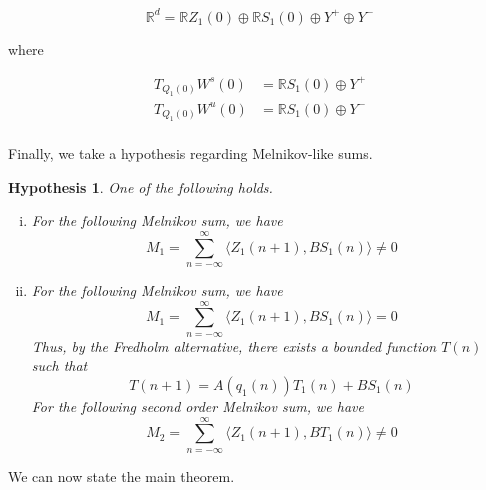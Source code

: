 \documentclass[12pt]{article}
\def\R{{\mathbb R}}
\newtheorem{hypothesis}{Hypothesis}
\begin{document}
\begin{equation}\label{tangentdecomp}
\R^d = \R Z_1(0) \oplus \R S_1(0) \oplus Y^+ \oplus Y^-
\end{equation}

where 

\begin{align*}
T_{Q_1(0)}W^s(0) &= \R S_1(0) \oplus Y^+ \\
T_{Q_1(0)}W^u(0) &= \R S_1(0) \oplus Y^- \\
\end{align*}

Finally, we take a hypothesis regarding Melnikov-like sums.

\begin{hypothesis}\label{melnikovhyp}
One of the following holds.
\begin{enumerate}[(i)]
\item For the following Melnikov sum, we have
\[
M_1 = \sum_{n = -\infty}^\infty \langle Z_1(n+1), B S_1(n) \rangle \neq 0
\]
\item For the following Melnikov sum, we have
\[
M_1 = \sum_{n = -\infty}^\infty \langle Z_1(n+1), B S_1(n) \rangle = 0
\]
Thus, by the Fredholm alternative, there exists a bounded function $T(n)$ such that 
\[
T(n+1) = A(q_1(n)) T_1(n) + B S_1(n)
\]
For the following second order Melnikov sum, we have
\[
M_2 = \sum_{n = -\infty}^\infty \langle Z_1(n+1), B T_1(n) \rangle \neq 0 
\]
\end{enumerate}
\end{hypothesis}

We can now state the main theorem.
\end{document}
